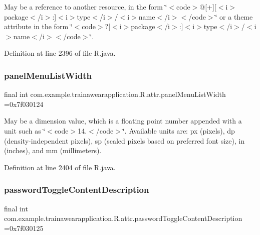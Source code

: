 May be a reference to another resource, in the form \char`\"{}$<$code$>$@\mbox{[}+\mbox{]}\mbox{[}$<$i$>$package$<$/i$>$\+:\mbox{]}$<$i$>$type$<$/i$>$/$<$i$>$name$<$/i$>$$<$/code$>$\char`\"{} or a theme attribute in the form \char`\"{}$<$code$>$?\mbox{[}$<$i$>$package$<$/i$>$\+:\mbox{]}$<$i$>$type$<$/i$>$/$<$i$>$name$<$/i$>$$<$/code$>$\char`\"{}. 

Definition at line 2396 of file R.\+java.

\mbox{\label{classcom_1_1example_1_1trainawearapplication_1_1_r_1_1attr_a50e1e96a08953c09ec81510e75a05723}} 
\subsubsection{\texorpdfstring{panelMenuListWidth}{panelMenuListWidth}}
{\footnotesize\ttfamily final int com.\+example.\+trainawearapplication.\+R.\+attr.\+panel\+Menu\+List\+Width =0x7f030124\hspace{0.3cm}{\ttfamily [static]}}

May be a dimension value, which is a floating point number appended with a unit such as \char`\"{}$<$code$>$14.\+5sp$<$/code$>$\char`\"{}. Available units are\+: px (pixels), dp (density-\/independent pixels), sp (scaled pixels based on preferred font size), in (inches), and mm (millimeters). 

Definition at line 2404 of file R.\+java.

\mbox{\label{classcom_1_1example_1_1trainawearapplication_1_1_r_1_1attr_a5923a25b48bb17ee0244d9ffd0fd0d85}} 
\subsubsection{\texorpdfstring{passwordToggleContentDescription}{passwordToggleContentDescription}}
{\footnotesize\ttfamily final int com.\+example.\+trainawearapplication.\+R.\+attr.\+password\+Toggle\+Content\+Description =0x7f030125\hspace{0.3cm}{\ttfamily [static]}}

